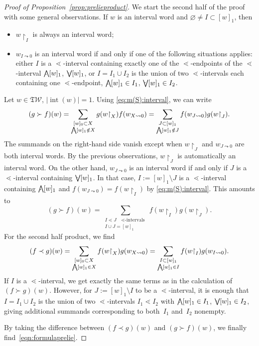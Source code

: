 \documentclass[pdftex]{sigma}
\newcommand\INT[1]{\operatorname{int}(#1)}
\renewcommand{\restriction}[2]{{#1\mathbin{\upharpoonright}_{#2}}}
\newcommand{\translucidation}[2]{{{#1}_{#2\leadsto0}}}
\newcommand{\stdl}{\lessdot}
\newcommand{\bigwedgedot}{{\mathop{\bigwedge\hspace{-7.8pt}\raisebox{-1pt}[0pt][0pt]{$\cdot$}\hspace{3pt}}\nolimits}}
\newcommand{\bigwedgedots}{{\mathop{\bigwedge\hspace{-6.5pt}\raisebox{-1.5pt}[0pt][0pt]{$\cdot$}\hspace{2pt}}\nolimits}}
\newcommand{\bigveedot}{{\mathop{\bigvee\hspace{-8pt}\raisebox{1pt}[0pt][0pt]{$\cdot$}\hspace{3pt}}\nolimits}}
\newcommand{\SWc}{{\mathfrak{T}\mathcal{W}}}
\numberwithin{equation}{section}
\begin{document}
\begin{proof}[Proof of Proposition~\ref{prop:prelieproduct}]
 We start the second half of the proof with some general observations. If $w$ is an interval word and $\varnothing\neq I\subset [w]_1$, then
 \begin{itemize}\itemsep=0pt
 \item $\restriction{w}{I}$ is always an interval word;
 \item $\translucidation{w}{I}$ is an interval word if and only if one of the following situations applies: either $I$ is a $\stdl$-interval containing exactly one of the $\stdl$-endpoints of the $\stdl$-interval $\bigwedgedot [w]_1$, $\bigveedot [w]_1$, or $I=I_1\cup I_2$ is the union of two $\stdl$-intervals each containing one $\stdl$-endpoint, $\bigwedgedot [w]_1\in I_1$, $\bigveedot [w]_1\in I_2$.
 \end{itemize}

 Let $w\in \SWc$, $|\INT{w}|=1$. Using \eqref{eq:m(S):interval}, we can write
 \[(g \succ f)(w)
 =
 \sum_{\substack{[w]_0 \subset X\\ \bigwedgedots [w]_1 \notin X}}
 g(\restriction{w}{X})f(\translucidation{w}{X})
 =
 \sum_{\substack{J\subset[w]_1\\ \bigwedgedots [w]_1 \notin J}}
 f(\translucidation{w}{J})g(\restriction{w}{J}).
 \]
 The summands on the right-hand side vanish except when $\restriction{w}{J}$ and $\translucidation{w}{J}$ are both interval words. By the previous observations, $\restriction{w}{J}$ is automatically an interval word. On the other hand, $\translucidation{w}{J}$ is an interval word if and only if $J$ is a $\stdl$-interval containing $\bigveedot [w]_1$. In that case, $I:=[w]_1\setminus J$ is a $\stdl$-interval containing $\bigwedgedot [w]_1$ and $f(\translucidation{w}{J})=f(\restriction{w}{I})$ by \eqref{eq:m(S):interval}. This amounts to
 \[
 (g\succ f)(w)
 =
 \sum_{\substack{I\stdl J\text{ $\stdl$-intervals}\\I\cup J=[w]_1}}
 f(\restriction{w}{I})g(\restriction{w}{J}).
 \]
 For the second half product, we find
 \[(f \prec g)(w)
 =
 \sum_{\substack{[w]_0 \subset X\\ \bigwedgedots [w]_1 \in X}}
 f(\restriction{w}{X})g(\translucidation{w}{X})
 =
 \sum_{\substack{I\subset[w]_1\\ \bigwedgedots [w]_1 \in I}}
 f(\restriction{w}{I})g(\translucidation{w}{I}).
 \]
 If $I$ is a $\stdl$-interval, we get exactly the same terms as in the calculation of $(f\succ g)(w)$. However, for $J:=[w]_1\setminus I$ to be a $\stdl$-interval, it is enough that $I=I_1\cup I_2$ is the union of two $\stdl$-intervals $I_1\stdl I_2$ with $\bigwedgedot[w]_1\in I_1$, $\bigveedot [w]_1\in I_2$, giving additional summands corresponding to both~$I_1$ and~$I_2$ nonempty.

 By taking the difference between $(f\prec g)(w)$ and $(g\succ f)(w)$, we finally find~\eqref{eqn:formulaprelie}.
 \end{proof}
\end{document}
